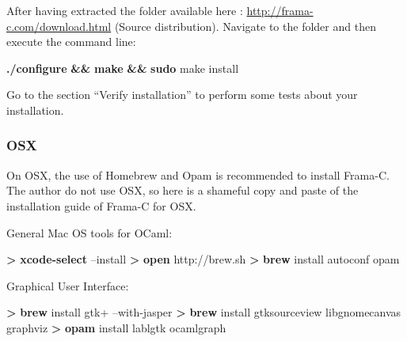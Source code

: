 \documentclass[12pt,francais,]{scrbook}
\newenvironment{Shaded}{}{}
\newcommand{\KeywordTok}[1]{\textcolor[rgb]{0.00,0.44,0.13}{\textbf{{#1}}}}
\newcommand{\NormalTok}[1]{{#1}}
\begin{document}
After having extracted the folder available here :
\url{http://frama-c.com/download.html} (Source distribution). Navigate
to the folder and then execute the command line:

\begin{footnotesize}\begin{Shaded}
\begin{Highlighting}[]
\KeywordTok{./configure} \KeywordTok{&&} \KeywordTok{make} \KeywordTok{&&} \KeywordTok{sudo} \NormalTok{make install}
\end{Highlighting}
\end{Shaded}\end{footnotesize}

Go to the section ``Verify installation'' to perform some tests about
your installation.

\subsubsection{OSX}\label{osx}

On OSX, the use of Homebrew and Opam is recommended to install Frama-C.
The author do not use OSX, so here is a shameful copy and paste of the
installation guide of Frama-C for OSX.

General Mac OS tools for OCaml:

\begin{footnotesize}\begin{Shaded}
\begin{Highlighting}[]
\KeywordTok{>} \KeywordTok{xcode-select} \NormalTok{--install}
\KeywordTok{>} \KeywordTok{open} \NormalTok{http://brew.sh}
\KeywordTok{>} \KeywordTok{brew} \NormalTok{install autoconf opam}
\end{Highlighting}
\end{Shaded}\end{footnotesize}

Graphical User Interface:

\begin{footnotesize}\begin{Shaded}
\begin{Highlighting}[]
\KeywordTok{>} \KeywordTok{brew} \NormalTok{install gtk+ --with-jasper}
\KeywordTok{>} \KeywordTok{brew} \NormalTok{install gtksourceview libgnomecanvas graphviz}
\KeywordTok{>} \KeywordTok{opam} \NormalTok{install lablgtk ocamlgraph }
\end{Highlighting}
\end{Shaded}\end{footnotesize}
\end{document}
